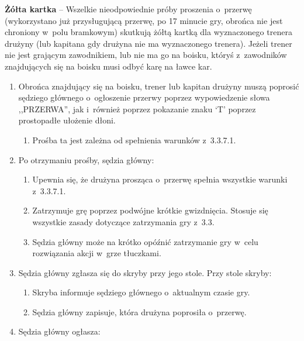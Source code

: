 \documentclass[12pt,a4paper]{article}
\renewcommand{\paragraph}[1]{
  \oldparagraph{#1}%
  \leftskip2cm
}
\newcommand\yellowcard[1]{\bgroup\textcolor{darkyellow}{\textbf{#1}}}
\begin{document}
\yellowcard{Żółta kartka} -- Wszelkie nieodpowiednie próby proszenia o~przerwę
(wykorzystano już przysługującą przerwę, po 17 minucie gry, obrońca nie jest chroniony w~polu bramkowym) skutkują żółtą kartką dla
wyznaczonego trenera drużyny (lub kapitana gdy drużyna nie ma wyznaczonego trenera). Jeżeli trener nie jest grającym
zawodnikiem, lub nie ma go na boisku, któryś z~zawodników znajdujących
się na boisku musi odbyć karę na ławce kar.

\paragraph{Procedura przerwy}

\begin{enumerate}
	\item
	      Obrońca znajdujący się na boisku, trener lub kapitan drużyny muszą
	      poprosić sędziego głównego o~ogłoszenie przerwy poprzez wypowiedzenie
	      słowa ,,PRZERWA'', jak i~również poprzez pokazanie znaku `T' poprzez
	      prostopadłe ułożenie dłoni.

	      \begin{enumerate}
		      \item
		            Prośba ta jest zależna od spełnienia warunków z~3.3.7.1.
	      \end{enumerate}
	\item
	      Po otrzymaniu prośby, sędzia główny:

	      \begin{enumerate}
		      \item
		            Upewnia się, że drużyna prosząca o~przerwę spełnia wszystkie warunki
		            z~3.3.7.1.
		      \item
		            Zatrzymuje grę poprzez podwójne krótkie gwizdnięcia. Stosuje się
		            wszystkie zasady dotyczące zatrzymania gry z~3.3.
		      \item
		            Sędzia główny może na krótko opóźnić zatrzymanie gry w~celu
		            rozwiązania akcji w~grze tłuczkami.
	      \end{enumerate}
	\item
	      Sędzia główny zgłasza się do skryby przy jego stole. Przy stole
	      skryby:

	      \begin{enumerate}
		      \item
		            Skryba informuje sędziego głównego o~aktualnym czasie gry.
		      \item
		            Sędzia główny zapisuje, która drużyna poprosiła o~przerwę.
	      \end{enumerate}
	\item
	      Sędzia główny ogłasza:


\end{enumerate}
\end{document}
